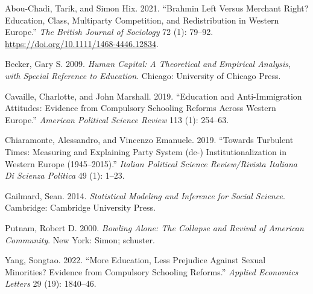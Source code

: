 \documentclass[
]{article}
\newlength{\cslhangindent}
\newlength{\cslentryspacingunit} %
\newenvironment{CSLReferences}[2] %
 {%
  \setlength{\parindent}{0pt}
  \ifodd #1
  \let\oldpar\par
  \def\par{\hangindent=\cslhangindent\oldpar}
  \fi
  \setlength{\parskip}{#2\cslentryspacingunit}
 }%
 {}
\begin{document}
\hypertarget{refs}{}
\begin{CSLReferences}{1}{0}
\leavevmode{}%
Abou-Chadi, Tarik, and Simon Hix. 2021. {``Brahmin {Left} Versus
{Merchant} {Right}? {Education}, Class, Multiparty Competition, and
Redistribution in {Western} {Europe}.''} \emph{The British Journal of
Sociology} 72 (1): 79--92.
\url{https://doi.org/10.1111/1468-4446.12834}.

\leavevmode{}%
Becker, Gary S. 2009. \emph{Human Capital: A Theoretical and Empirical
Analysis, with Special Reference to Education}. Chicago: University of
Chicago Press.

\leavevmode{}%
Cavaille, Charlotte, and John Marshall. 2019. {``Education and
Anti-Immigration Attitudes: Evidence from Compulsory Schooling Reforms
Across Western Europe.''} \emph{American Political Science Review} 113
(1): 254--63.

\leavevmode{}%
Chiaramonte, Alessandro, and Vincenzo Emanuele. 2019. {``Towards
Turbulent Times: Measuring and Explaining Party System (de-)
Institutionalization in Western Europe (1945--2015).''} \emph{Italian
Political Science Review/Rivista Italiana Di Scienza Politica} 49 (1):
1--23.

\leavevmode{}%
Gailmard, Sean. 2014. \emph{Statistical {Modeling} and {Inference} for
{Social} {Science}}. Cambridge: Cambridge University Press.

\leavevmode{}%
Putnam, Robert D. 2000. \emph{Bowling Alone: The Collapse and Revival of
American Community}. New York: Simon; schuster.

\leavevmode{}%
Yang, Songtao. 2022. {``More Education, Less Prejudice Against Sexual
Minorities? Evidence from Compulsory Schooling Reforms.''} \emph{Applied
Economics Letters} 29 (19): 1840--46.

\end{CSLReferences}
\end{document}
